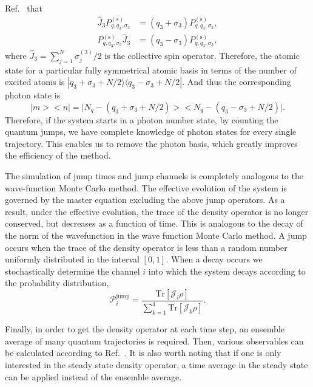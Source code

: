 \documentclass[aps,
twocolumn,
showpacs,
superscriptaddress,groupedaddress]{revtex4}
\begin{document}
Ref.~\cite{PhysRevA.87.062101} that
\begin{equation}
\begin{split}
  \hat{J}_3P_{q,q_3,\sigma_3}^{(\mathrm{s})}&=
  (q_3+\sigma_3)P_{q,q_3,\sigma_3}^{(\mathrm{s})},\\
  P_{q,q_3,\sigma_3}^{(\mathrm{s})}\hat{J}_3&=
  (q_3-\sigma_3)P_{q,q_3,\sigma_3}^{(\mathrm{s})},
\end{split}
\end{equation}
where $\hat{J}_3=\sum_{j=1}^N\sigma_j^{(3)}/2$ is the collective spin
operator. Therefore, the atomic state for a particular fully symmetrical
atomic basis in terms of the number of excited atoms is
$|q_3+\sigma_3+N/2\rangle\langle q_3-\sigma_3+N/2|$. And thus the
corresponding photon state is
\begin{equation}
\bigl|m\bigr>\bigl<n\bigr|=
\bigl|N_q-(q_3+\sigma_3+N/2)\bigr>
\bigl<N_q-(q_3-\sigma_3+N/2)\bigr|.
\end{equation}
Therefore, if the system starts in a photon number state, by counting the quantum jumps, we have complete knowledge of
photon states for every single trajectory. This enables us to remove the
photon basis, which greatly improves the efficiency of the method. 

The simulation of jump times and jump channels is completely analogous
to the wave-function Monte Carlo method. The effective evolution of the
system is governed by the master equation excluding the above jump
operators. As a result, under the effective evolution, the trace of the
density operator is no longer conserved, but decreases as a function of
time.  This is analogous to the decay of the norm of the wavefunction in
the wave function Monte Carlo method. A jump occurs when the trace of
the density operator is less than a random number uniformly distributed
in the interval $[0,1]$. When a decay occurs we stochastically determine
the channel $i$ into which the system decays according to the
probability distribution,
\begin{equation}
\mathcal{P}_i^{\mathrm{jump}}=\frac{\mathrm{Tr}[\mathcal{J}_i\rho]}{\sum_{k=1}^4
\mathrm{Tr}[\mathcal{J}_k\rho]}.
\end{equation}

Finally, in order to get the density operator at each time step, an
ensemble average of many quantum trajectories is required. Then, various
observables can be calculated according to Ref.~\cite{PhysRevA.87.062101}. It is
also worth noting that if one is only interested in the steady state
density operator, a time average in the steady state can be applied
instead of the ensemble average.
\end{document}
